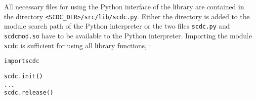 All necessary files for using the Python interface of the library are contained in the directory \texttt{<SCDC\_DIR>/src/lib/scdc.py}.
Either the directory is added to the module search path of the Python interpreter or the two files \texttt{scdc.py} and \texttt{scdcmod.so} have to be available to the Python interpreter.
Importing the module \texttt{scdc} is sufficient for using all library functions, \eg:
\begin{alltt}
  import scdc

  scdc.init()
  ...
  scdc.release()
\end{alltt}
